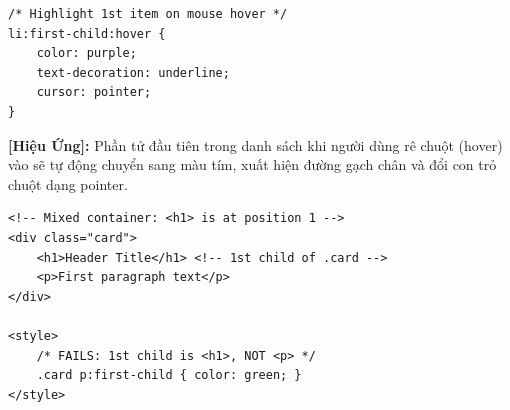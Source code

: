 \documentclass[11pt,oneside]{book}
\begin{document}
\begin{codeWindow}
\begin{lstlisting}[language=CSS3]
/* Highlight 1st item on mouse hover */
li:first-child:hover {
    color: purple;
    text-decoration: underline;
    cursor: pointer;
}
\end{lstlisting}
\end{codeWindow}

\begin{tipBox}
\textbf{[Hiệu Ứng]:} Phần tử đầu tiên trong danh sách khi người dùng rê chuột (hover) vào sẽ tự động chuyển sang màu tím, xuất hiện đường gạch chân và đổi con trỏ chuột dạng pointer.
\end{tipBox}

\begin{codeWindow}
\begin{lstlisting}[language=HTML5]
<!-- Mixed container: <h1> is at position 1 -->
<div class="card">
    <h1>Header Title</h1> <!-- 1st child of .card -->
    <p>First paragraph text</p>
</div>

<style>
    /* FAILS: 1st child is <h1>, NOT <p> */
    .card p:first-child { color: green; }
</style>
\end{lstlisting}
\end{codeWindow}
\end{document}
